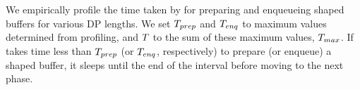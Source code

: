 We empirically profile the time taken by {\prepare} for preparing and enqueueing
shaped buffers for various DP lengths. We set $T_{prep}$ and
$T_{enq}$ to maximum values determined from profiling, and $T$ to
the sum of these maximum values, \ie $T_{max}$.
If {\prepare} takes time less than
$T_{prep}$ (or $T_{enq}$, respectively) to prepare (or enqueue) a
shaped buffer, it sleeps until the end of the interval before moving to the next
phase.


